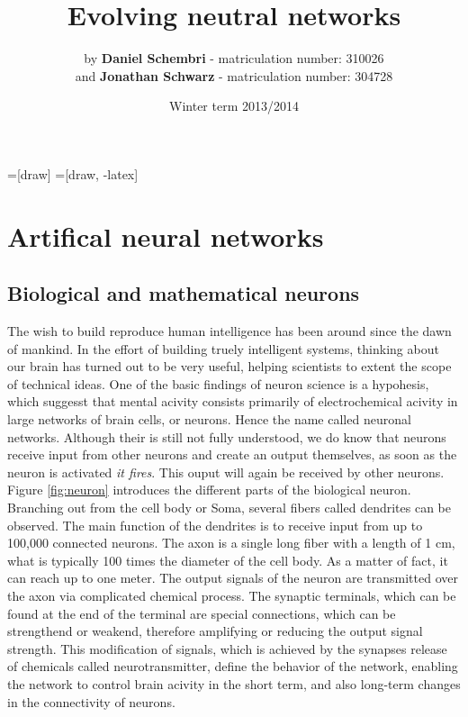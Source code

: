 \documentclass[10pt,a4paper,DIV=11]{scrreprt}
\title
{
    Evolving neutral networks\\
}
\author
{
    by \textbf{Daniel Schembri} - matriculation number: 310026 \\
    and \textbf{Jonathan Schwarz} - matriculation number: 304728
}
\date
{
    Winter term 2013/2014
}
\begin{document}
=[draw]
=[draw, -latex] 


\maketitle
\thispagestyle{empty}
\newpage
{\large\tableofcontents}
\newpage

\chapter{Artifical neural networks}
\section{Biological and mathematical neurons}
The wish to build reproduce human intelligence has been around since the dawn of mankind. In the effort of building truely intelligent systems, thinking about our brain has turned out to be very useful, helping scientists to extent the scope of technical ideas. One of the basic findings of neuron science is a hypohesis, which suggesst that mental acivity consists primarily of electrochemical acivity in large networks of brain cells, or neurons. Hence the name called neuronal networks. 
Although their is still not fully understood, we do know that neurons receive input from other neurons and create an output themselves, as soon as the neuron is activated \textit{it fires}. This ouput will again be received by other neurons. Figure \ref{fig:neuron} introduces the different parts of the biological neuron. Branching out from the cell body or Soma, several fibers called dendrites can be observed. The main function of the dendrites is to receive input from up to 100,000 connected neurons. The axon is a single long fiber with a length of 1 cm, what is typically 100 times the diameter of the cell body. As a matter of fact, it can reach up to one meter. The output signals of the neuron are transmitted over the axon via complicated chemical process. The synaptic terminals, which can be found at the end of the terminal are special connections, which can be strengthend or weakend, therefore amplifying or reducing the output signal strength. This modification of signals, which is achieved by the synapses release of chemicals called neurotransmitter, define the behavior of the network, enabling the network to control brain acivity in the short term, and also long-term changes in the connectivity of neurons.
\end{document}

